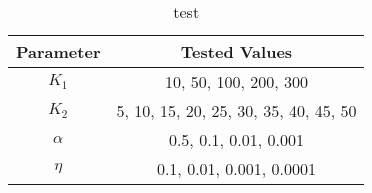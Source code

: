 \begin{table}[h]
	\centering
	\label{tab:params}
	\begin{tabular}{c|c}
		Parameter & Tested Values\\
		\hline
		$K_1$ & 10, 50, 100, 200, 300\\
		$K_2$ & 5, 10, 15, 20, 25, 30, 35, 40, 45, 50\\
		$\alpha$ & 0.5, 0.1, 0.01, 0.001\\
		$\eta$ & 0.1, 0.01, 0.001, 0.0001\\
	\end{tabular}
	\caption{test}
\end{table}
